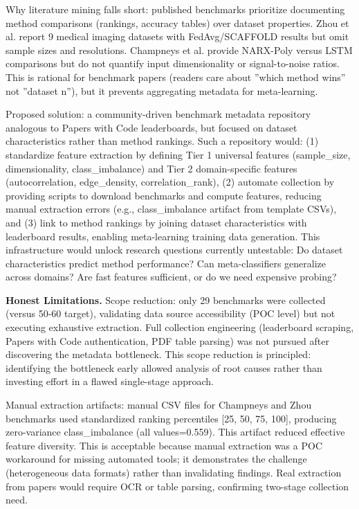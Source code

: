 Why literature mining falls short: published benchmarks prioritize documenting method comparisons (rankings, accuracy tables) over dataset properties. Zhou et al. report 9 medical imaging datasets with FedAvg/SCAFFOLD results but omit sample sizes and resolutions. Champneys et al. provide NARX-Poly versus LSTM comparisons but do not quantify input dimensionality or signal-to-noise ratios. This is rational for benchmark papers (readers care about ''which method wins'' not ''dataset n''), but it prevents aggregating metadata for meta-learning.

Proposed solution: a community-driven benchmark metadata repository analogous to Papers with Code leaderboards, but focused on dataset characteristics rather than method rankings. Such a repository would: (1) standardize feature extraction by defining Tier 1 universal features (sample\_size, dimensionality, class\_imbalance) and Tier 2 domain-specific features (autocorrelation, edge\_density, correlation\_rank), (2) automate collection by providing scripts to download benchmarks and compute features, reducing manual extraction errors (e.g., class\_imbalance artifact from template CSVs), and (3) link to method rankings by joining dataset characteristics with leaderboard results, enabling meta-learning training data generation. This infrastructure would unlock research questions currently untestable: Do dataset characteristics predict method performance? Can meta-classifiers generalize across domains? Are fast features sufficient, or do we need expensive probing?

\textbf{Honest Limitations.} Scope reduction: only 29 benchmarks were collected (versus 50-60 target), validating data source accessibility (POC level) but not executing exhaustive extraction. Full collection engineering (leaderboard scraping, Papers with Code authentication, PDF table parsing) was not pursued after discovering the metadata bottleneck. This scope reduction is principled: identifying the bottleneck early allowed analysis of root causes rather than investing effort in a flawed single-stage approach.

Manual extraction artifacts: manual CSV files for Champneys and Zhou benchmarks used standardized ranking percentiles [25, 50, 75, 100], producing zero-variance class\_imbalance (all values=0.559). This artifact reduced effective feature diversity. This is acceptable because manual extraction was a POC workaround for missing automated tools; it demonstrates the challenge (heterogeneous data formats) rather than invalidating findings. Real extraction from papers would require OCR or table parsing, confirming two-stage collection need.

